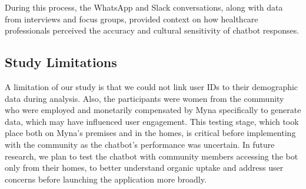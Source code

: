 During this process, the WhatsApp and Slack conversations, along with data from interviews and focus groups, provided context on how healthcare professionals perceived the accuracy and cultural sensitivity of chatbot responses.

\subsection{Study Limitations}
A limitation of our study is that we could not link user IDs to their demographic data during analysis.
Also, the participants were women from the community who were employed and monetarily compensated by Myna specifically to generate data, which may have influenced user engagement. This testing stage, which took place both on Myna's premises and in the   homes, is critical before implementing with the community as the chatbot's performance was uncertain. In future research, we plan to test the chatbot with community members accessing the bot only from their homes, to better understand organic uptake and address user concerns before launching the application more broadly.

